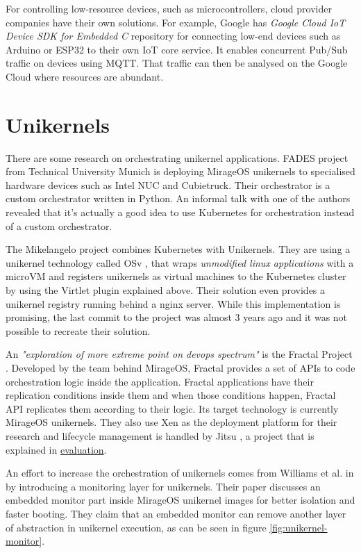 For controlling low-resource devices, such as microcontrollers, cloud provider companies have their own solutions. For example, Google has \textit{Google Cloud IoT Device SDK for Embedded C} repository for connecting low-end devices such as Arduino or ESP32 to their own IoT core service. It enables concurrent Pub/Sub traffic on devices using MQTT. That traffic can then be analysed on the Google Cloud where resources are abundant.

\section*{Unikernels}
There are some research on orchestrating unikernel applications. FADES project \cite{fades} from Technical University Munich is deploying MirageOS unikernels to specialised hardware devices such as Intel NUC and Cubietruck. Their orchestrator is a custom orchestrator written in Python. An informal talk with one of the authors revealed that it's actually a good idea to use Kubernetes for orchestration instead of a custom orchestrator.


The Mikelangelo project \cite{Struckmann2018} combines Kubernetes with Unikernels. They are using a unikernel technology called OSv \cite{osv}, that wraps \textit{unmodified linux applications} with a microVM and registers unikernels as virtual machines to the Kubernetes cluster by using the Virtlet plugin explained above. Their solution even provides a unikernel registry running behind a nginx server. While this implementation is promising, the last commit to the project was almost 3 years ago and it was not possible to recreate their solution.

An \textit{"exploration of more extreme point on devops spectrum"} is the Fractal Project \cite{Koleini2019}. Developed by the team behind MirageOS, Fractal provides a set of APIs to code orchestration logic inside the application. Fractal applications have their replication conditions inside them and when those conditions happen, Fractal API replicates them according to their logic. Its target technology is currently MirageOS unikernels. They also use Xen as the deployment platform for their research and lifecycle management is handled by Jitsu \cite{jitsu}, a project that is explained in \hyperref[chapter:evaluation]{evaluation}.

An effort to increase the orchestration of unikernels comes from Williams et al. in \cite{Williams2016} by introducing a monitoring layer for unikernels. Their paper discusses an embedded monitor part inside MirageOS unikernel images for better isolation and faster booting. They claim that an embedded monitor can remove another layer of abstraction in unikernel execution, as can be seen in figure \ref{fig:unikernel-monitor}.

